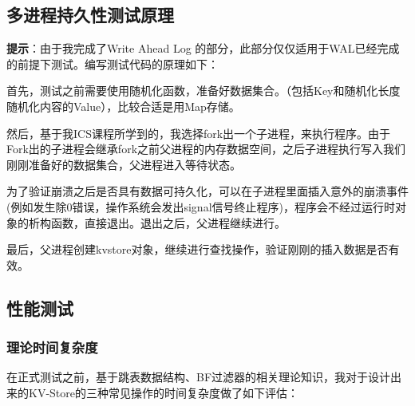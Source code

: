 \documentclass[fontset=windows]{article}
\begin{document}
\subsection{多进程持久性测试原理}
\textbf{提示}：由于我完成了Write Ahead Log 的部分，此部分仅仅适用于WAL已经完成的前提下测试。编写测试代码的原理如下：

首先，测试之前需要使用随机化函数，准备好数据集合。（包括Key和随机化长度随机化内容的Value），比较合适是用Map存储。

然后，基于我ICS课程所学到的，我选择fork出一个子进程，来执行程序。由于Fork出的子进程会继承fork之前父进程的内存数据空间，之后子进程执行写入我们刚刚准备好的数据集合，父进程进入等待状态。

为了验证崩溃之后是否具有数据可持久化，可以在子进程里面插入意外的崩溃事件(例如发生除0错误，操作系统会发出signal信号终止程序)，程序会不经过运行时对象的析构函数，直接退出。退出之后，父进程继续进行。

最后，父进程创建kvstore对象，继续进行查找操作，验证刚刚的插入数据是否有效。


\subsection{性能测试}

\subsubsection{理论时间复杂度}

在正式测试之前，基于跳表数据结构、BF过滤器的相关理论知识，我对于设计出来的KV-Store的三种常见操作的时间复杂度做了如下评估：
\end{document}
